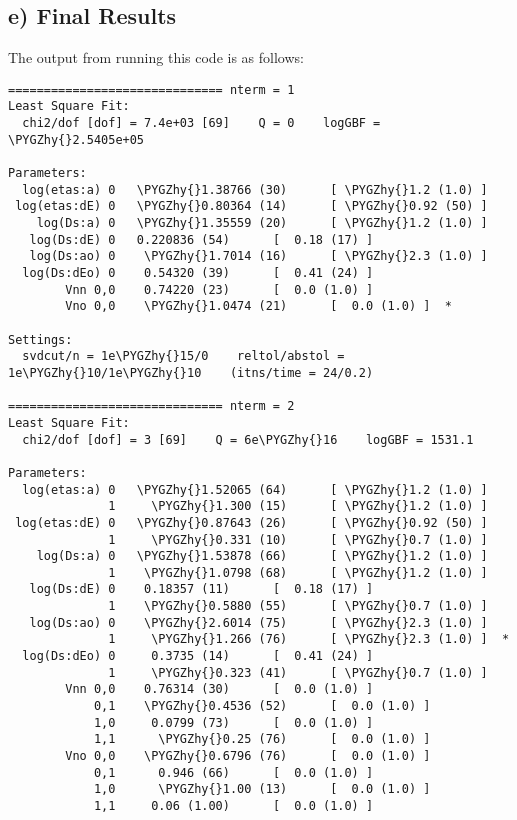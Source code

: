 \documentclass[letterpaper,10pt,english]{sphinxmanual}
\def\PYGZhy{\char`\-}
\begin{document}
\subsection{e) Final Results}
\label{corrfitter:e-final-results}
The output from running this code is as follows:

\begin{Verbatim}[commandchars=\\\{\}]
============================== nterm = 1
Least Square Fit:
  chi2/dof [dof] = 7.4e+03 [69]    Q = 0    logGBF = \PYGZhy{}2.5405e+05

Parameters:
  log(etas:a) 0   \PYGZhy{}1.38766 (30)      [ \PYGZhy{}1.2 (1.0) ]  
 log(etas:dE) 0   \PYGZhy{}0.80364 (14)      [ \PYGZhy{}0.92 (50) ]  
    log(Ds:a) 0   \PYGZhy{}1.35559 (20)      [ \PYGZhy{}1.2 (1.0) ]  
   log(Ds:dE) 0   0.220836 (54)      [  0.18 (17) ]  
   log(Ds:ao) 0    \PYGZhy{}1.7014 (16)      [ \PYGZhy{}2.3 (1.0) ]  
  log(Ds:dEo) 0    0.54320 (39)      [  0.41 (24) ]  
        Vnn 0,0    0.74220 (23)      [  0.0 (1.0) ]  
        Vno 0,0    \PYGZhy{}1.0474 (21)      [  0.0 (1.0) ]  *

Settings:
  svdcut/n = 1e\PYGZhy{}15/0    reltol/abstol = 1e\PYGZhy{}10/1e\PYGZhy{}10    (itns/time = 24/0.2)

============================== nterm = 2
Least Square Fit:
  chi2/dof [dof] = 3 [69]    Q = 6e\PYGZhy{}16    logGBF = 1531.1

Parameters:
  log(etas:a) 0   \PYGZhy{}1.52065 (64)      [ \PYGZhy{}1.2 (1.0) ]  
              1     \PYGZhy{}1.300 (15)      [ \PYGZhy{}1.2 (1.0) ]  
 log(etas:dE) 0   \PYGZhy{}0.87643 (26)      [ \PYGZhy{}0.92 (50) ]  
              1     \PYGZhy{}0.331 (10)      [ \PYGZhy{}0.7 (1.0) ]  
    log(Ds:a) 0   \PYGZhy{}1.53878 (66)      [ \PYGZhy{}1.2 (1.0) ]  
              1    \PYGZhy{}1.0798 (68)      [ \PYGZhy{}1.2 (1.0) ]  
   log(Ds:dE) 0    0.18357 (11)      [  0.18 (17) ]  
              1    \PYGZhy{}0.5880 (55)      [ \PYGZhy{}0.7 (1.0) ]  
   log(Ds:ao) 0    \PYGZhy{}2.6014 (75)      [ \PYGZhy{}2.3 (1.0) ]  
              1     \PYGZhy{}1.266 (76)      [ \PYGZhy{}2.3 (1.0) ]  *
  log(Ds:dEo) 0     0.3735 (14)      [  0.41 (24) ]  
              1     \PYGZhy{}0.323 (41)      [ \PYGZhy{}0.7 (1.0) ]  
        Vnn 0,0    0.76314 (30)      [  0.0 (1.0) ]  
            0,1    \PYGZhy{}0.4536 (52)      [  0.0 (1.0) ]  
            1,0     0.0799 (73)      [  0.0 (1.0) ]  
            1,1      \PYGZhy{}0.25 (76)      [  0.0 (1.0) ]  
        Vno 0,0    \PYGZhy{}0.6796 (76)      [  0.0 (1.0) ]  
            0,1      0.946 (66)      [  0.0 (1.0) ]  
            1,0      \PYGZhy{}1.00 (13)      [  0.0 (1.0) ]  
            1,1     0.06 (1.00)      [  0.0 (1.0) ]  


\end{Verbatim}
\end{document}

